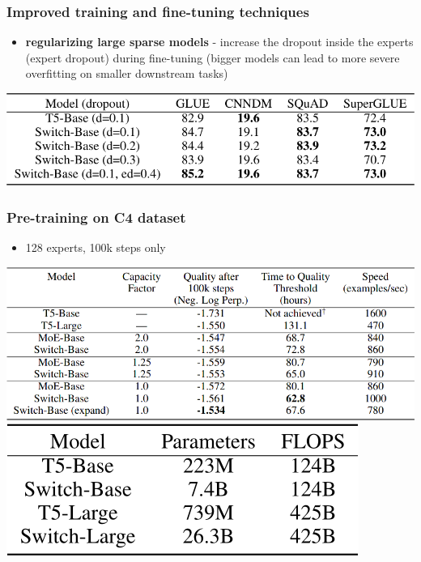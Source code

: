 \documentclass{beamer}
\begin{document}
\begin{frame}
    \frametitle{Improved training and fine-tuning techniques}
    \begin{itemize}
        \item \textbf{regularizing large sparse models} - increase the dropout inside the experts (expert dropout) during fine-tuning (bigger models can lead to more severe overfitting on smaller downstream tasks)
    \end{itemize}
    \begin{center}
        \includegraphics[scale=0.37]{img/switch_transformers_dropout.png}
    \end{center}
\end{frame}

\begin{frame}
    \frametitle{Pre-training on C4 dataset}
    \begin{itemize}
    	\item \scriptsize{128 experts, 100k steps only}
    \end{itemize}
    \begin{center}
        \includegraphics[scale=0.4]{img/switch_transformers_benchmark.png}
        \includegraphics[scale=0.345]{img/switch_transformers_flops.png}
    \end{center}
\end{frame}
\end{document}
